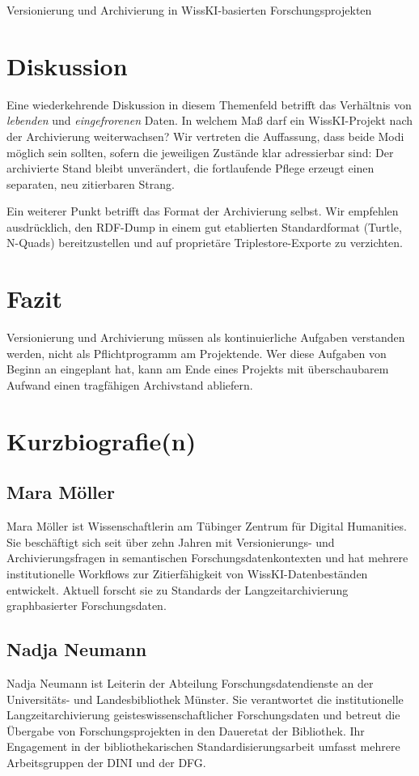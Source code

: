 \begin{beitrag}{Versionierung und Archivierung in WissKI-basierten Forschungsprojekten}
\section{Diskussion}
Eine wiederkehrende Diskussion in diesem Themenfeld betrifft das Verhältnis von \emph{lebenden} und \emph{eingefrorenen} Daten. In welchem Maß darf ein WissKI-Projekt nach der Archivierung weiterwachsen? Wir vertreten die Auffassung, dass beide Modi möglich sein sollten, sofern die jeweiligen Zustände klar adressierbar sind: Der archivierte Stand bleibt unverändert, die fortlaufende Pflege erzeugt einen separaten, neu zitierbaren Strang.

Ein weiterer Punkt betrifft das Format der Archivierung selbst. Wir empfehlen ausdrücklich, den RDF-Dump in einem gut etablierten Standardformat (Turtle, N-Quads) bereitzustellen und auf proprietäre Triplestore-Exporte zu verzichten.

\section{Fazit}
Versionierung und Archivierung müssen als kontinuierliche Aufgaben verstanden werden, nicht als Pflichtprogramm am Projektende. Wer diese Aufgaben von Beginn an eingeplant hat, kann am Ende eines Projekts mit überschaubarem Aufwand einen tragfähigen Archivstand abliefern.

\end{beitrag}

\section*{Kurzbiografie(n)}

\subsection*{Mara Möller}
Mara Möller ist Wissenschaftlerin am Tübinger Zentrum für Digital Humanities. Sie beschäftigt sich seit über zehn Jahren mit Versionierungs- und Archivierungsfragen in semantischen Forschungsdatenkontexten und hat mehrere institutionelle Workflows zur Zitierfähigkeit von WissKI-Datenbeständen entwickelt. Aktuell forscht sie zu Standards der Langzeitarchivierung graphbasierter Forschungsdaten.

\subsection*{Nadja Neumann}
Nadja Neumann ist Leiterin der Abteilung Forschungsdatendienste an der Universitäts- und Landesbibliothek Münster. Sie verantwortet die institutionelle Langzeitarchivierung geisteswissenschaftlicher Forschungsdaten und betreut die Übergabe von Forschungsprojekten in den Daueretat der Bibliothek. Ihr Engagement in der bibliothekarischen Standardisierungsarbeit umfasst mehrere Arbeitsgruppen der DINI und der DFG.

